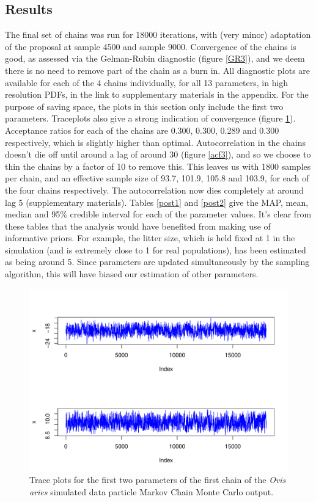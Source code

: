 \documentclass[a4paper,12pt]{article}
\begin{document}
\subsection{Results}
The final set of chains was run for 18000 iterations, with (very minor) adaptation of the proposal at sample 4500 and sample 9000. Convergence of the chains is good, as assessed via the Gelman-Rubin diagnostic \citep{GRTest} (figure \ref{GR3}), and we deem there is no need to remove part of the chain as a burn in. All diagnostic plots are available for each of the 4 chains individually, for all 13 parameters, in high resolution PDFs, in the link to supplementary materials in the appendix. For the purpose of saving space, the plots in this section only include the first two parameters. Traceplots also give a strong indication of convergence (figure \ref{trace3}). Acceptance ratios for each of the chains are 0.300, 0.300, 0.289 and 0.300 respectively, which is slightly higher than optimal. Autocorrelation in the chains doesn't die off until around a lag of around 30 (figure \ref{acf3}), and so we choose to thin the chains by a factor of 10 to remove this. This leaves us with 1800 samples per chain, and an effective sample size of 93.7, 101.9, 105.8 and 103.9, for each of the four chains respectively. The autocorrelation now dies completely at around lag 5 (supplementary materials). Tables \ref{post1} and \ref{post2} give the MAP, mean, median and 95\% credible interval for each of the parameter values. It's clear from these tables that the analysis would have benefited from making use of informative priors. For example, the litter size, which is held fixed at 1 in the simulation (and is extremely close to 1 for real populations), has been estimated as being around 5. Since parameters are updated simultaneously by the sampling algorithm, this will have biased our estimation of other parameters.

\begin{figure}[H]
\centering
\includegraphics[scale=0.75]{chainFirst3_1.PDF}
\caption{\label{trace3}Trace plots for the first two parameters of the first chain of the \textit{Ovis aries} simulated data particle Markov Chain Monte Carlo output.}
\end{figure}
\end{document}
